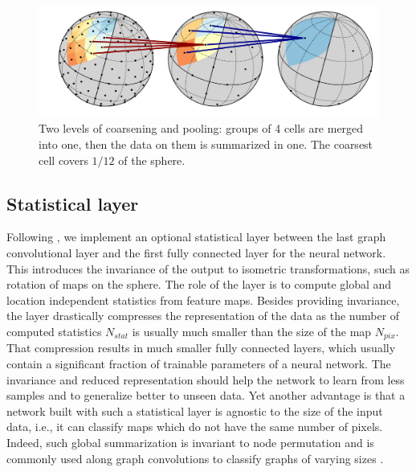 \documentclass[final,twocolumn,3p,times,authoryear]{elsarticle}
\newcommand{\1}{\b{1}}              %
\newcommand{\0}{\b{0}}              %
\begin{document}

\begin{figure}
	\centering
	\includegraphics[trim=1.1cm 0cm 0cm 0cm, width=\linewidth]{figures/figure_pooling_svg.pdf}
	\caption{Two levels of coarsening and pooling: groups of 4 cells are merged into one, then the data on them is summarized in one. The coarsest cell covers $1/12$ of the sphere.}
	\label{fig:pooling}
\end{figure}

\subsection{Statistical layer}
\label{sec:stat_layer}

Following \citet{khasanova2017tigranet}, we implement an optional statistical layer between the last graph convolutional layer and the first fully connected layer for the neural network.
This introduces the invariance of the output to isometric transformations, such as rotation of maps on the sphere.
The role of the layer is to compute global and location independent statistics from feature maps.
Besides providing invariance, the layer drastically compresses the representation of the data as the number of computed statistics $N_{stat}$ is usually much smaller than the size of the map $N_{pix}$. That compression results in much smaller fully connected layers, which usually contain a significant fraction of trainable parameters of a neural network.
The invariance and reduced representation should help the network to learn from less samples and to generalize better to unseen data. Yet another advantage is that a network built with such a statistical layer is agnostic to the size of the input data, i.e., it can classify maps which do not have the same number of pixels. Indeed, such global summarization is invariant to node permutation and is commonly used along graph convolutions to classify graphs of varying sizes \citep{duvenaud2015gcn, li2015gatedgnn}.
\end{document}
